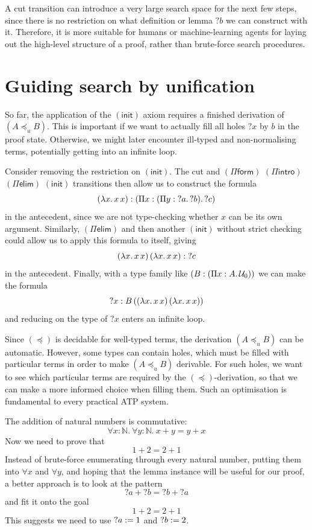 \documentclass[twoside]{report}
\begin{document}
A cut transition can introduce a very large search space for the next few steps, since there is no restriction on what definition or lemma ${?b}$ we can construct with it. Therefore, it is more suitable for humans or machine-learning agents for laying out the high-level structure of a proof, rather than brute-force search procedures.

\section{Guiding search by unification}
\label{sec:tableau_unification_search}

So far, the application of the $(\mathsf{init})$ axiom requires a finished derivation of $(A \preceq_u B)$. This is important if we want to actually fill all holes ${?x}$ by $b$ in the proof state. Otherwise, we might later encounter ill-typed and non-normalising terms, potentially getting into an infinite loop.

\begin{example}
    Consider removing the restriction on $(\mathsf{init})$. The cut and $(\Pi\mathsf{form})$ $(\Pi\mathsf{intro})$ $(\Pi\mathsf{elim})$ $(\mathsf{init})$ transitions then allow us to construct the formula
    $$(\lambda{x}.\,{{x}\,{x}}) : (\Pi{x} : {(\Pi{y} : {?a}.\,{?b})}.\,{?c})$$
    in the antecedent, since we are not type-checking whether $x$ can be its own argument. Similarly, $(\Pi\mathsf{elim})$ and then another $(\mathsf{init})$ without strict checking could allow us to apply this formula to itself, giving
    $${(\lambda{x}.\,{{x}\,{x}})}\,{(\lambda{x}.\,{{x}\,{x}})} : {?c}$$
    in the antecedent. Finally, with a type family like $(B : (\Pi{x} : {A}.\,{\mathcal U_0}))$ we can make the formula
    $${?x} : {B}\,{(}{(\lambda{x}.\,{{x}\,{x}})}\,{(\lambda{x}.\,{{x}\,{x}})})$$
    and reducing on the type of ${?x}$ enters an infinite loop.
\end{example}

Since $(\preceq)$ is decidable for well-typed terms, the derivation $(A \preceq_u B)$ can be automatic. However, some types can contain holes, which must be filled with particular terms in order to make $(A \preceq_u B)$ derivable. For such holes, we want to see which particular terms are required by the $(\preceq)$-derivation, so that we can make a more informed choice when filling them. Such an optimisation is fundamental to every practical ATP system.

\begin{example}
    The addition of natural numbers is commutative:
    $$\forall x : \mathbb N.\ \forall y : \mathbb N.\ x + y = y + x$$
    Now we need to prove that
    $$1 + 2 = 2 + 1$$
    Instead of brute-force enumerating through every natural number, putting them into $\forall x$ and $\forall y$, and hoping that the lemma instance will be useful for our proof, a better approach is to look at the pattern
    $${?a} + {?b} = {?b} + {?a}$$
    and fit it onto the goal
    $$1 + 2 = 2 + 1$$
    This suggests we need to use ${?a} := 1$ and ${?b} := 2$.
\end{example}
\end{document}

